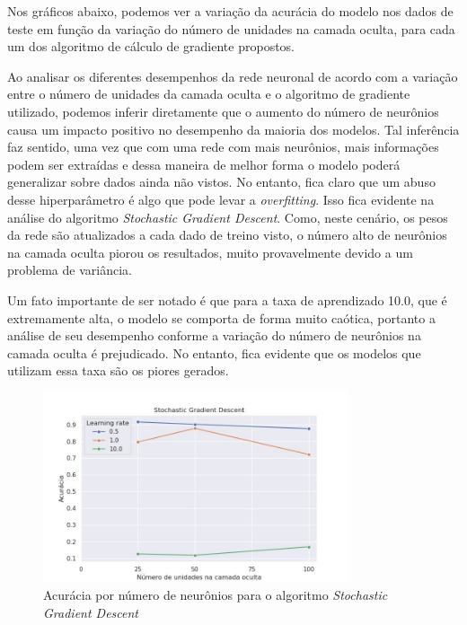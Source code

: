 \documentclass{article}
\begin{document}
Nos gráficos abaixo, podemos ver a variação da acurácia do modelo nos dados de teste em função da variação do número de unidades na camada oculta, para cada um dos algoritmo de cálculo de gradiente propostos.

Ao analisar os diferentes desempenhos da rede neuronal de acordo com a variação entre o número de unidades da camada oculta e o algoritmo de gradiente utilizado, podemos inferir diretamente que o aumento do número de neurônios
causa um impacto positivo no desempenho da maioria dos modelos. Tal inferência faz sentido, uma vez que com uma rede com mais neurônios, mais informações podem ser extraídas e dessa maneira de melhor forma o modelo poderá generalizar sobre
dados ainda não vistos. No entanto, fica claro que um abuso desse hiperparâmetro é algo que pode levar a \textit{overfitting}. Isso fica evidente na análise do algoritmo \textit{Stochastic Gradient Descent}. Como, neste cenário, os pesos da rede são atualizados a cada dado de treino visto, o número alto de neurônios na camada oculta piorou os resultados, muito provavelmente devido
a um problema de variância.

Um fato importante de ser notado é que para a taxa de aprendizado 10.0, que é extremamente alta, o modelo se comporta de forma muito caótica, portanto a análise de seu desempenho conforme a variação do número de neurônios na
camada oculta é prejudicado. No entanto, fica evidente que os modelos que utilizam essa taxa são os piores gerados.

\begin{figure}[H]
    \centering
    \includegraphics[width=0.8\textwidth]{images/tradeoff/SGD.jpg}
    \caption{Acurácia por número de neurônios para o algoritmo \textit{Stochastic Gradient Descent}}
\end{figure}
\end{document}
